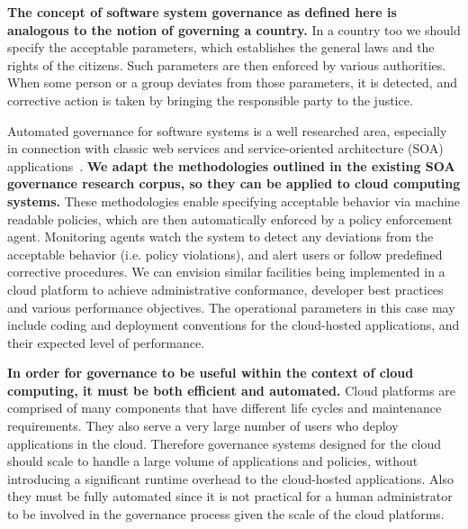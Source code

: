 \textbf{The concept of software system governance as defined here is analogous to the
notion of governing a country.} In a country too we should specify the acceptable
parameters, which establishes the general laws and the rights of the citizens. Such 
parameters are then
enforced by various authorities. When some person or a group deviates from those parameters,
it is detected, and corrective action is taken by bringing the responsible party to the justice.

Automated governance for software systems is a well researched area,
especially in connection with classic web services and service-oriented architecture 
(SOA) applications~\cite{gartner-soa-gov,soagov,Schepers:2008:LAS:1363686.1363932,5577268,4730489}. 
\textbf{We adapt the methodologies outlined in the existing SOA governance research corpus, so
they can be applied to cloud computing systems.}
These methodologies enable specifying
acceptable behavior via machine readable policies, which are then automatically enforced by
a policy enforcement agent. Monitoring agents watch the system to detect any deviations from
the acceptable behavior (i.e. policy violations), and alert users or follow predefined corrective
procedures. We can envision similar facilities being implemented in a cloud platform to 
achieve administrative conformance, developer best practices and various performance objectives. The operational
parameters in this case may include coding and deployment conventions for the cloud-hosted
applications, and their expected level of performance.

\textbf{In order for governance to be
useful within the context of cloud computing, it must be both efficient and automated.}
Cloud platforms are comprised of many components that have different life cycles
and maintenance requirements. 
They also serve a very large number of users who deploy applications in
the cloud. Therefore governance systems designed for the cloud should scale to handle a 
large volume of applications and policies,
without introducing a significant runtime overhead to the cloud-hosted applications.
Also they must be fully automated since it is not practical for a human administrator to be
involved in the governance process given the scale of the cloud platforms.

